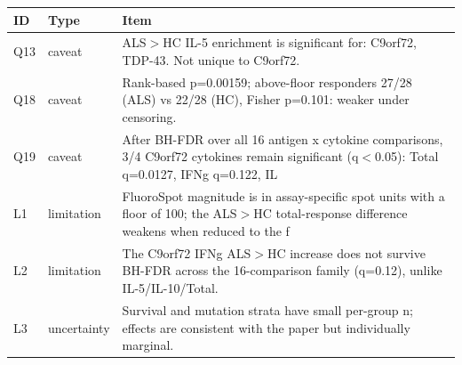 \begin{tabular}{llp{11.0cm}}
\toprule
ID & Type & Item \\
\midrule
Q13 & caveat & ALS$>$HC IL-5 enrichment is significant for: C9orf72, TDP-43. Not unique to C9orf72. \\
Q18 & caveat & Rank-based p=0.00159; above-floor responders 27/28 (ALS) vs 22/28 (HC), Fisher p=0.101: weaker under censoring. \\
Q19 & caveat & After BH-FDR over all 16 antigen x cytokine comparisons, 3/4 C9orf72 cytokines remain significant (q$<$0.05): Total q=0.0127, IFNg q=0.122, IL \\
L1 & limitation & FluoroSpot magnitude is in assay-specific spot units with a floor of 100; the ALS$>$HC total-response difference weakens when reduced to the f \\
L2 & limitation & The C9orf72 IFNg ALS$>$HC increase does not survive BH-FDR across the 16-comparison family (q=0.12), unlike IL-5/IL-10/Total. \\
L3 & uncertainty & Survival and mutation strata have small per-group n; effects are consistent with the paper but individually marginal. \\
\bottomrule
\end{tabular}
